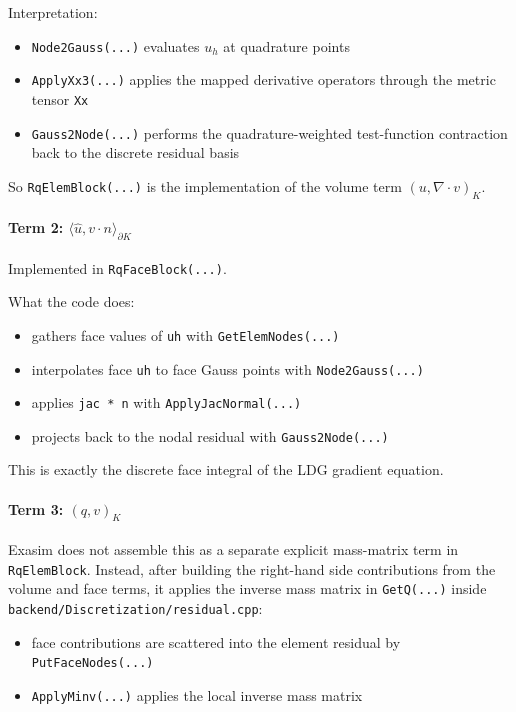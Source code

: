 \documentclass[11pt]{article}
\begin{document}
Interpretation:

\begin{itemize}[leftmargin=*]
\item \texttt{Node2Gauss(...)} evaluates $u_h$ at quadrature points
\item \texttt{ApplyXx3(...)} applies the mapped derivative operators through
the metric tensor \texttt{Xx}
\item \texttt{Gauss2Node(...)} performs the quadrature-weighted test-function
contraction back to the discrete residual basis
\end{itemize}

So \texttt{RqElemBlock(...)} is the implementation of the volume term
$(u, \nabla \cdot v)_K$.

\paragraph{Term 2: $\langle \hat{u}, v \cdot n \rangle_{\partial K}$}

Implemented in \texttt{RqFaceBlock(...)}.

What the code does:

\begin{itemize}[leftmargin=*]
\item gathers face values of \texttt{uh} with \texttt{GetElemNodes(...)}
\item interpolates face \texttt{uh} to face Gauss points with
\texttt{Node2Gauss(...)}
\item applies \texttt{jac * n} with \texttt{ApplyJacNormal(...)}
\item projects back to the nodal residual with \texttt{Gauss2Node(...)}
\end{itemize}

This is exactly the discrete face integral of the LDG gradient equation.

\paragraph{Term 3: $(q, v)_K$}

Exasim does not assemble this as a separate explicit mass-matrix term in
\texttt{RqElemBlock}. Instead, after building the right-hand side
contributions from the volume and face terms, it applies the inverse mass
matrix in \texttt{GetQ(...)} inside
\texttt{backend/Discretization/residual.cpp}:

\begin{itemize}[leftmargin=*]
\item face contributions are scattered into the element residual by
\texttt{PutFaceNodes(...)}
\item \texttt{ApplyMinv(...)} applies the local inverse mass matrix
\end{itemize}
\end{document}
